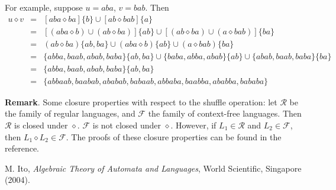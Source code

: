 \documentclass[12pt]{article}
\begin{document}
For example, suppose $u=aba$, $v=bab$.  Then
\begin{eqnarray*}
u\diamond v &=& [aba \diamond ba]\lbrace b\rbrace \cup [ab \diamond bab]\lbrace a\rbrace \\
&=& [(aba \diamond b) \cup (ab \diamond ba) ]\lbrace ab\rbrace \cup [(ab \diamond ba) \cup (a \diamond bab) ]\lbrace ba\rbrace \\
&=& (ab \diamond ba)\lbrace ab,ba\rbrace \cup (aba\diamond b)\lbrace ab\rbrace \cup (a\diamond bab)\lbrace ba\rbrace \\
&=& \lbrace abba, baab, abab, baba\rbrace \lbrace ab,ba\rbrace \cup \lbrace baba, abba, abab \rbrace \lbrace ab\rbrace \cup \lbrace abab, baab, baba \rbrace \lbrace ba \rbrace \\
&=& \lbrace abba, baab, abab, baba\rbrace \lbrace ab,ba\rbrace \\
&=& \lbrace abbaab, baabab, ababab, babaab, abbaba, baabba, ababba, bababa \rbrace
\end{eqnarray*}

\textbf{Remark}.  Some closure properties with respect to the shuffle operation: let $\mathscr{R}$ be the family of regular languages, and $\mathscr{F}$ the family of context-free languages.  Then $\mathscr{R}$ is closed under $\diamond$.  $\mathscr{F}$ is not closed under $\diamond$.  However, if $L_1\in \mathscr{R}$ and $L_2\in \mathscr{F}$, then $L_1 \diamond L_2 \in \mathscr{F}$.  The proofs of these closure properties can be found in the reference.

\begin{thebibliography}{9}
 M. Ito, {\em Algebraic Theory of Automata and Languages}, World Scientific, Singapore (2004).
\end{thebibliography}
\end{document}
